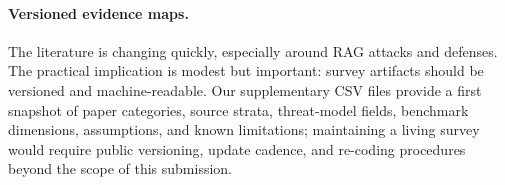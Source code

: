 \paragraph{Versioned evidence maps.}
The literature is changing quickly, especially around RAG attacks and defenses. The practical implication is modest but important: survey artifacts should be versioned and machine-readable. Our supplementary CSV files provide a first snapshot of paper categories, source strata, threat-model fields, benchmark dimensions, assumptions, and known limitations; maintaining a living survey would require public versioning, update cadence, and re-coding procedures beyond the scope of this submission.
